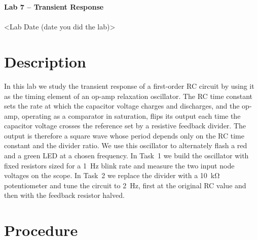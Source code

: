 \documentclass[11pt]{article}
\begin{document}
\begin{center}
    {\LARGE\bfseries Lab 7 -- Transient Response}\\[0.8em]
    {}\\[0.3em]
    {\large <Lab Date (date you did the lab)>}
\end{center}
\vspace{1em}

\section*{Description}

In this lab we study the transient response of a first-order RC circuit by using
it as the timing element of an op-amp relaxation oscillator. The RC time constant
sets the rate at which the capacitor voltage charges and discharges, and the
op-amp, operating as a comparator in saturation, flips its output each time the
capacitor voltage crosses the reference set by a resistive feedback divider. The
output is therefore a square wave whose period depends only on the RC time
constant and the divider ratio. We use this oscillator to alternately flash a red
and a green LED at a chosen frequency. In Task~1 we build the oscillator with
fixed resistors sized for a \SI{1}{\hertz} blink rate and measure the two input
node voltages on the scope. In Task~2 we replace the divider with a
\SI{10}{\kilo\ohm} potentiometer and tune the circuit to \SI{2}{\hertz}, first at
the original RC value and then with the feedback resistor halved.

\section*{Procedure}
\end{document}
